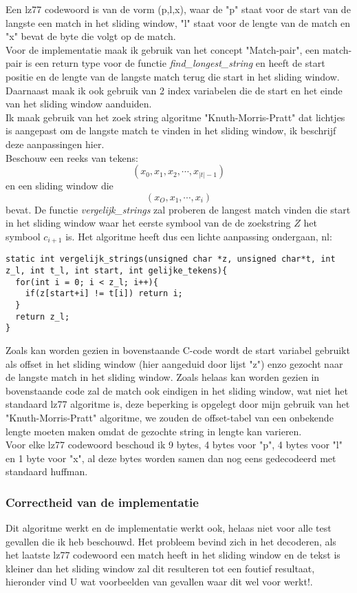 \documentclass[10pt,a4paper]{report}
\begin{document}
Een lz77 codewoord is van de vorm (p,l,x), waar de "p" staat voor de start van de langste een match in het sliding window, "l" staat voor de lengte van de match en "x" bevat de byte die volgt op de match.\\

Voor de implementatie maak ik gebruik van het concept "Match-pair", een match-pair is een return type voor de functie \emph{find\_longest\_string} en heeft de start positie en de lengte van de langste match terug die start in het sliding window. Daarnaast maak ik ook gebruik van 2 index variabelen die de start en het einde van het sliding window aanduiden.\\

Ik maak gebruik van het zoek string algoritme "Knuth-Morris-Pratt" dat lichtjes is aangepast om de langste match te vinden in het sliding window, ik beschrijf deze aanpassingen hier.\\

Beschouw een reeks van tekens:
$$(x_{0},x_{1},x_{2},\cdots,x_{|t|-1})$$
en een sliding window die 
$$
(x_{O},x_{1},\cdots,x_{i})$$
bevat. De functie \emph{vergelijk\_strings} zal proberen de langest match vinden die start in het sliding window waar het eerste symbool van de de zoekstring $Z$ het symbool $c_{i+1}$ is. Het algoritme heeft dus een lichte aanpassing ondergaan, nl:
\begin{lstlisting}
static int vergelijk_strings(unsigned char *z, unsigned char*t, int z_l, int t_l, int start, int gelijke_tekens){
  for(int i = 0; i < z_l; i++){
    if(z[start+i] != t[i]) return i; 
  }
  return z_l;
}
\end{lstlisting}
Zoals kan worden gezien in bovenstaande C-code wordt de start variabel gebruikt als offset in het sliding window (hier aangeduid door lijst "z") enzo gezocht naar de langste match in het sliding window. Zoals helaas kan worden gezien in bovenstaande code zal de match ook eindigen in het sliding window, wat niet het standaard lz77 algoritme is, deze beperking is opgelegt door mijn gebruik van het "Knuth-Morris-Pratt" algoritme, we zouden de offset-tabel van een onbekende lengte moeten maken omdat de gezochte string in lengte kan varieren. \\

Voor elke lz77 codewoord beschoud ik 9 bytes, 4 bytes voor "p", 4 bytes voor "l" en 1 byte voor "x", al deze bytes worden samen dan nog eens gedecodeerd met standaard huffman. 
\subsubsection*{Correctheid van de implementatie}
Dit algoritme werkt en de implementatie werkt ook, helaas niet voor alle test gevallen die ik heb beschouwd. Het probleem bevind zich in het decoderen, als het laatste lz77 codewoord een match heeft in het sliding window en de tekst is kleiner dan het sliding window zal dit resulteren tot een foutief resultaat, hieronder vind U wat voorbeelden van gevallen waar dit wel voor werkt!.
\end{document}
